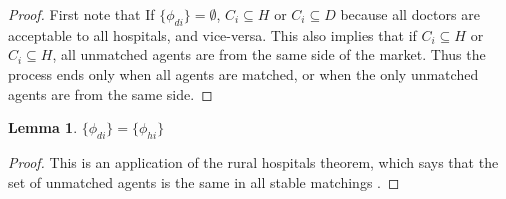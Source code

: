 \documentclass[WP]{AEA}
\newtheorem{lemma}{Lemma}
\begin{document}
\begin{proof}
	First note that If $\{\phi_{di}\} = \emptyset$, $C_i \subseteq H$ or $C_i \subseteq D$ because all doctors are acceptable to all hospitals, and vice-versa. This also implies that if $C_i \subseteq H$ or $C_i \subseteq H$, all unmatched agents are from the same side of the market.  Thus the process ends only when all agents are matched, or when the only unmatched agents are from the same side.
\end{proof}

\begin{lemma}
	$\{\phi_{di}\}=\{\phi_{hi}\}$
\end{lemma}
\begin{proof}
	This is an application of the rural hospitals theorem, which says that the set of unmatched agents is the same in all stable matchings \cite{Roth1986}.
\end{proof}
\end{document}
